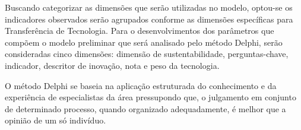 Buscando categorizar as dimensões que serão utilizadas no modelo, optou-se os indicadores observados serão agrupados conforme as dimensões específicas para Transferência de Tecnologia. Para o desenvolvimentos dos parâmetros que compõem o modelo preliminar que será analisado pelo método Delphi, serão consideradas cinco dimensões: dimensão de sustentabilidade, perguntas-chave, indicador, descritor de inovação, nota e peso da tecnologia.

O método Delphi se baseia na aplicação estruturada do conhecimento e da experiência de especialistas da área pressupondo que, o julgamento em conjunto de determinado processo, quando organizado adequadamente, é melhor que a opinião de um só indivíduo.










